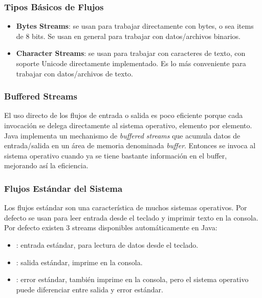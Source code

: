 \documentclass{beamer}
\begin{document}
\begin{frame}
  \frametitle{Tipos Básicos de Flujos}

  \begin{itemize}
  \item \textbf{Bytes Streams}: se usan para trabajar directamente
    con bytes, o sea items de 8 bits. Se usan en general para trabajar
    con datos/archivos binarios.
    
  \item \textbf{Character Streams}: se usan para trabajar con
    caracteres de texto, con soporte Unicode directamente
    implementado. Es lo más conveniente para trabajar con
    datos/archivos de texto.
  \end{itemize}
  
\end{frame}

\begin{frame}
  \frametitle{Buffered Streams}

  El uso directo de los flujos de entrada o salida es poco eficiente
  porque cada invocación se delega directamente al sistema operativo,
  elemento por elemento. Java implementa un mechanismo de
  \emph{buffered streams} que acumula datos de entrada/salida en un
  área de memoria denominada \emph{buffer}. Entonces se invoca al
  sistema operativo cuando ya se tiene bastante información en el
  buffer, mejorando así la eficiencia.
  
\end{frame}

\begin{frame}
  \frametitle{Flujos Estándar del Sistema}

  Los flujos estándar son una característica de muchos sistemas
  operativos. Por defecto se usan para leer entrada desde el teclado y
  imprimir texto en la consola. Por defecto existen 3 streams
  disponibles automáticamente en Java:

  \begin{itemize}
  \item {}: entrada estándar, para lectura de datos
    desde el teclado.
    
  \item {}: salida estándar, imprime en la consola.

  \item {}: error estándar, también imprime en la
    consola, pero el sistema operativo puede diferenciar entre salida
    y error estándar.
  \end{itemize}
  
\end{frame}
\end{document}
